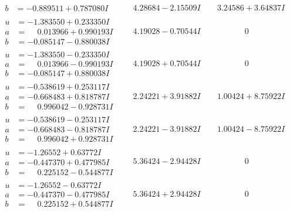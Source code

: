 \documentclass[1p]{elsarticle_modified}
\theoremstyle{definition}
\begin{document}
$$\begin{array}{c|c|c}
\begin{aligned}
b &= -0.889511 + 0.787080 I\end{aligned}
 & \phantom{-}4.28684 - 2.15509 I & \phantom{-}3.24586 + 3.64837 I \\ \hline\begin{aligned}
u &= -1.383550 + 0.233350 I \\
a &= \phantom{-}0.013966 + 0.990193 I \\
b &= -0.085147 - 0.880038 I\end{aligned}
 & \phantom{-}4.19028 - 0.70544 I & \phantom{-0.000000 } 0 \\ \hline\begin{aligned}
u &= -1.383550 - 0.233350 I \\
a &= \phantom{-}0.013966 - 0.990193 I \\
b &= -0.085147 + 0.880038 I\end{aligned}
 & \phantom{-}4.19028 + 0.70544 I & \phantom{-0.000000 } 0 \\ \hline\begin{aligned}
u &= -0.538619 + 0.253117 I \\
a &= -0.668483 + 0.818787 I \\
b &= \phantom{-}0.996042 - 0.928731 I\end{aligned}
 & \phantom{-}2.24221 + 3.91882 I & \phantom{-}1.00424 + 8.75922 I \\ \hline\begin{aligned}
u &= -0.538619 - 0.253117 I \\
a &= -0.668483 - 0.818787 I \\
b &= \phantom{-}0.996042 + 0.928731 I\end{aligned}
 & \phantom{-}2.24221 - 3.91882 I & \phantom{-}1.00424 - 8.75922 I \\ \hline\begin{aligned}
u &= -1.26552 + 0.63772 I \\
a &= -0.447370 + 0.477985 I \\
b &= \phantom{-}0.225152 - 0.544877 I\end{aligned}
 & \phantom{-}5.36424 - 2.94428 I & \phantom{-0.000000 } 0 \\ \hline\begin{aligned}
u &= -1.26552 - 0.63772 I \\
a &= -0.447370 - 0.477985 I \\
b &= \phantom{-}0.225152 + 0.544877 I\end{aligned}
 & \phantom{-}5.36424 + 2.94428 I & \phantom{-0.000000 } 0 \\ \hline\begin{aligned}

\end{aligned}
\end{array}$$
\end{document}
